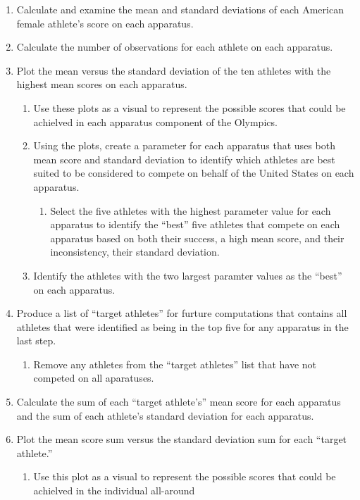 \documentclass[12pt]{article}
\begin{document}
\begin{enumerate}
  \item Calculate and examine the mean and standard deviations of each American female athlete's score 
  on each apparatus.
  \item Calculate the number of observations for each athlete on each apparatus.
  \item Plot the mean versus the standard deviation of the ten athletes with the highest mean scores on each 
  apparatus.
  \begin{enumerate}
    \item Use these plots as a visual to represent the possible scores that could be achielved in each apparatus 
    component of the Olympics.
    \item Using the plots, create a parameter for each apparatus that uses both mean score and standard 
    deviation to identify which athletes are best suited to be considered to compete on behalf of the United 
    States on each apparatus.
    \begin{enumerate}
      \item Select the five athletes with the highest parameter value for each apparatus to identify the ``best'' 
      five athletes that compete on each apparatus based on both their success, a high mean score, and their 
      inconsistency, their standard deviation.
    \end{enumerate}
    \item Identify the athletes with the two largest paramter values as the ``best'' on each apparatus.
  \end{enumerate}
  \item Produce a list of ``target athletes'' for furture computations that contains all athletes that were identified 
  as being in the top five for any apparatus in the last step.
  \begin{enumerate}
    \item Remove any athletes from the ``target athletes'' list that have not competed on all aparatuses.
  \end{enumerate}
  \item Calculate the sum of each ``target athlete's'' mean score for each apparatus and the sum of each athlete's standard 
  deviation for each apparatus.
  \item Plot the mean score sum versus the standard deviation sum for each ``target athlete.''
  \begin{enumerate}
    \item Use this plot as a visual to represent the possible scores that could be achielved in the individual all-around 

\end{enumerate}
\end{enumerate}
\end{document}
